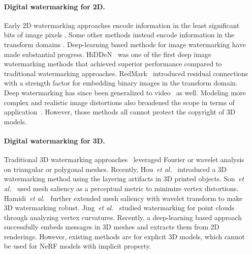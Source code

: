 \documentclass[10pt,twocolumn,letterpaper]{article}
\def\etal{{\emph{et al.}}}
\def\etal{\emph{ et al.}}
\def\etal{{\emph{et al.}}}
\begin{document}
\paragraph{Digital watermarking for 2D.} Early 2D watermarking approaches encode information in the least signiﬁcant bits of image pixels \cite{413536}. Some other methods instead encode information in the transform domains \cite{lai2010digital}. Deep-learning based methods for image watermarking have made substantial progress. HiDDeN~\cite{zhu2018hidden} was one of the first deep image watermarking methods that achieved superior performance compared to traditional watermarking approaches. RedMark~\cite{ahmadi2020redmark} introduced residual connections with a strength factor for
embedding binary images in the transform domain. Deep watermarking has since been generalized to video~\cite{weng2019high,zhang2019robust} as well. Modeling more complex and realistic image distortions also broadened the scope in terms of application~\cite{wengrowski2019light,tancik2020stegastamp}. However, those methods all cannot protect the copyright of 3D models.

\paragraph{Digital watermarking for 3D.} Traditional 3D watermarking approaches~\cite{ohbuchi2002frequency,praun1999robust,wu20153d} leveraged Fourier or wavelet analysis on triangular or polygonal meshes. Recently, Hou~\etal~\cite{hou2017blind} introduced a 3D watermarking method using the layering artifacts in 3D printed objects. Son~\etal~\cite{son2017perceptual} used mesh saliency as a perceptual metric to minimize vertex distortions. Hamidi~\etal~\cite{hamidi2019blind} further extended mesh saliency with wavelet transform to make 3D watermarking robust. Jing~\etal~\cite{liu2019novel} studied watermarking for point clouds through analyzing vertex curvatures. Recently, a deep-learning based approach \cite{Yoo_2022_CVPR} successfully embeds messages in 3D meshes and extracts them from 2D renderings. However, existing methods are for explicit 3D models, which cannot be used for NeRF models with implicit property.
\end{document}

